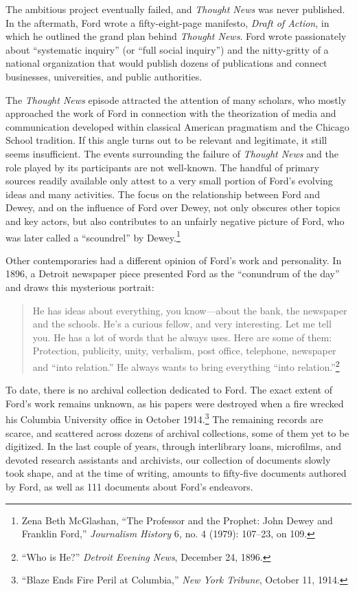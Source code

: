 \documentclass[twoside,symmetric,nobib,justified]{tufte-book}
\begin{document}
\noindent The ambitious project eventually failed, and \emph{Thought News} was
never published. In the aftermath, Ford wrote a fifty-eight-page
manifesto, \emph{Draft of Action}, in which he outlined the grand plan
behind \emph{Thought News}. Ford wrote passionately about ``systematic
inquiry'' (or ``full social inquiry'') and the nitty-gritty of a
national organization that would publish dozens of publications and
connect businesses, universities, and public authorities.

The \emph{Thought News} episode attracted the attention of many
scholars, who mostly approached the work of Ford in connection with the
theorization of media and communication developed within classical
American pragmatism and the Chicago School tradition. If this angle
turns out to be relevant and legitimate, it still seems insufficient.
The events surrounding the failure of \emph{Thought News} and the role
played by its participants are not well-known. The handful of primary
sources readily available only attest to a very small portion of Ford's
evolving ideas and many activities. The focus on the relationship
between Ford and Dewey, and on the influence of Ford over Dewey, not
only obscures other topics and key actors, but also contributes to an
unfairly negative picture of Ford, who was later called a ``scoundrel''
by Dewey.\footnote{Zena Beth McGlashan, ``The Professor and the Prophet:
  John Dewey and Franklin Ford,'' \emph{Journalism History} 6\emph{,}
  no. 4 (1979): 107--23, on 109.}

Other contemporaries had a different opinion of Ford's work and
personality. In 1896, a Detroit newspaper piece presented Ford as the
``conundrum of the day'' and draws this mysterious portrait:

\begin{quote}
He has ideas about everything, you know---about the bank, the newspaper
and the schools. He's a curious fellow, and very interesting. Let me
tell you. He has a lot of words that he always uses. Here are some of
them: Protection, publicity, unity, verbalism, post office, telephone,
newspaper and ``into relation.'' He always wants to bring everything
``into relation.''\footnote{``Who is He?'' \emph{Detroit Evening News},
  December 24, 1896.}
\end{quote}

\noindent To date, there is no archival collection dedicated to Ford. The exact
extent of Ford's work remains unknown, as his papers were destroyed when
a fire wrecked his Columbia University office in October
1914.\footnote{``Blaze Ends Fire Peril at Columbia,'' \emph{New York
  Tribune}, October 11, 1914.} The remaining records are scarce, and
scattered across dozens of archival collections, some of them yet to be
digitized. In the last couple of years, through interlibrary loans,
microfilms, and devoted research assistants and archivists, our
collection of documents slowly took shape, and at the time of writing,
amounts to fifty-five documents authored by Ford, as well as 111
documents about Ford's endeavors.
\end{document}
